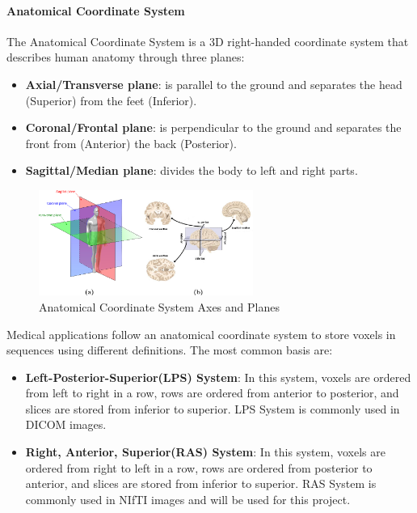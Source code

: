 \documentclass[12pt]{article}
\begin{document}
\paragraph*{Anatomical Coordinate System} \label{AnCoordSys}
The Anatomical Coordinate System is a 3D right-handed coordinate system that describes human anatomy through three planes:\cite{SlicerWikiCoordinateSystems} \cite{Nejad2017}
\begin{itemize}
  \item \textbf{Axial/Transverse plane}: is parallel to the ground and separates the head (Superior) from the feet (Inferior).
  \item \textbf{Coronal/Frontal plane}: is perpendicular to the ground and separates the front from (Anterior) the back (Posterior).
  \item \textbf{Sagittal/Median plane}: divides the body to left and right parts.
\end{itemize}
\begin{figure}[hbpt!]
  \centering
  \includegraphics[width=70mm]{anatomical-coordinate-sytem-fmri.png}
  \caption{Anatomical Coordinate System Axes and Planes~\cite{Asaei2015BrainML}}
  \label{anatomicalcoordfMRI}
\end{figure}

Medical applications follow an anatomical coordinate system to store voxels in sequences using different definitions. The most common basis are:
\begin{itemize}
  \item  \textbf{Left-Posterior-Superior(LPS) System}: In this system, voxels are ordered
        from left to right in a row, rows are ordered from anterior to posterior, and slices are
        stored from inferior to superior. LPS System is commonly used in DICOM images.
  \item  \textbf{Right, Anterior, Superior(RAS) System}: In this system, voxels are ordered
        from right to left in a row, rows are ordered from posterior to anterior, and slices are
        stored from inferior to superior. RAS System is commonly used in NIfTI images and will be used for this project.
\end{itemize}
\end{document}
